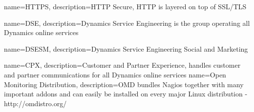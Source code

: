{
  name=HTTPS,
  description={HTTP Secure, HTTP is layered on top of SSL/TLS}
}

{
  name=DSE,
  description={Dynamics Service Engineering is the group operating all Dynamics online services}
}

{
  name=DSESM,
  description={Dynamics Service Engineering Social and Marketing}
}

{
  name=CPX,
  description={Customer and Partner Experience, handles customer and partner communications for all Dynamics online services}
}
{
  name=Open Monitoring Distribution,
  description={OMD bundles Nagios together with many important addons and can easily be installed on every major Linux distribution - http://omdistro.org/}
}

